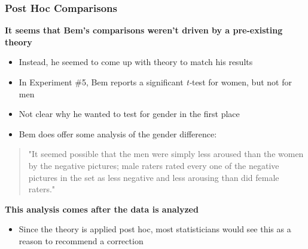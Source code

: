 \documentclass[10pt, block=fill]{beamer}
\begin{document}
\begin{frame}
    \frametitle{Post Hoc Comparisons}
    
    \textbf{It seems that Bem's comparisons weren't driven by a pre-existing theory}
    \begin{itemize}
        \item Instead, he seemed to come up with theory to match his results
        \item In Experiment \#5, Bem reports a significant \textit{t-}test for women, but not for men
        \item Not clear why he wanted to test for gender in the first place
        \item Bem does offer some analysis of the gender difference:
    \end{itemize}

    \begin{quote}
        "It seemed possible that the men were simply less aroused than the women by the negative pictures; male raters rated every one of the negative pictures in the set as less negative and less arousing than did female raters."
    \end{quote}
    
    \textbf{This analysis comes after the data is analyzed}
    \begin{itemize}
        \item Since the theory is applied post hoc, most statisticians would see this as a reason to recommend a correction
    \end{itemize}

\end{frame}
\end{document}
